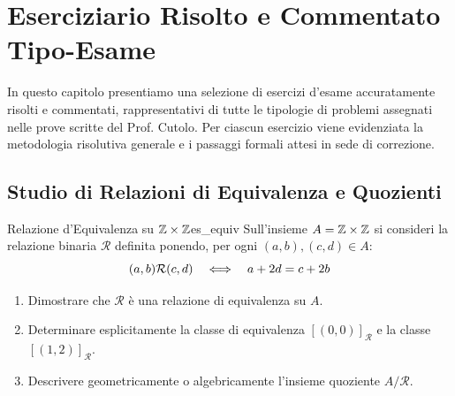 \chapter{Eserciziario Risolto e Commentato Tipo-Esame}
\label{chap:eserciziario}

In questo capitolo presentiamo una selezione di esercizi d'esame accuratamente risolti e commentati, rappresentativi di tutte le tipologie di problemi assegnati nelle prove scritte del Prof. Cutolo. Per ciascun esercizio viene evidenziata la metodologia risolutiva generale e i passaggi formali attesi in sede di correzione.

\section{Studio di Relazioni di Equivalenza e Quozienti}

\begin{esercizio}{Relazione d'Equivalenza su $\mathbb{Z} \times \mathbb{Z}$}{es_equiv}
Sull'insieme $A = \mathbb{Z} \times \mathbb{Z}$ si consideri la relazione binaria $\mathcal{R}$ definita ponendo, per ogni $(a, b), (c, d) \in A$:
\[
    (a, b) \mathcal{R} (c, d) \quad \Longleftrightarrow \quad a + 2d = c + 2b
\]
\begin{enumerate}
    \item Dimostrare che $\mathcal{R}$ è una relazione di equivalenza su $A$.
    \item Determinare esplicitamente la classe di equivalenza $[(0, 0)]_\mathcal{R}$ e la classe $[(1, 2)]_\mathcal{R}$.
    \item Descrivere geometricamente o algebricamente l'insieme quoziente $A/\mathcal{R}$.
\end{enumerate}
\end{esercizio}

